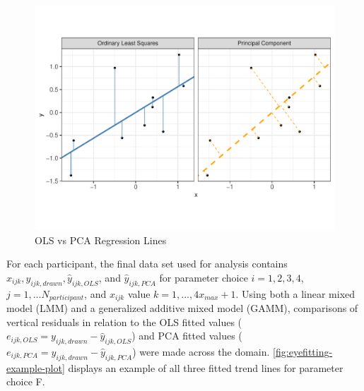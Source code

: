 \documentclass[print]{nuthesis}
\begin{document}
\begin{figure}
\includegraphics[width=1\linewidth]{thesis_files/figure-latex/ols-vs-pca-example-1} \caption{OLS vs PCA Regression Lines}\label{fig:ols-vs-pca-example}
\end{figure}

For each participant, the final data set used for analysis contains \(x_{ijk}, y_{ijk,drawn}, \hat y_{ijk,OLS}\), and \(\hat y_{ijk,PCA}\) for parameter choice \(i = 1,2,3,4\), \(j = 1,...N_{participant}\), and \(x_{ijk}\) value \(k = 1, ...,4 x_{max} + 1\).
Using both a linear mixed model (LMM) and a generalized additive mixed model (GAMM), comparisons of vertical residuals in relation to the OLS fitted values (\(e_{ijk,OLS} = y_{ijk,drawn} - \hat y_{ijk,OLS}\)) and PCA fitted values (\(e_{ijk,PCA} = y_{ijk,drawn} - \hat y_{ijk,PCA}\)) were made across the domain.
\cref{fig:eyefitting-example-plot} displays an example of all three fitted trend lines for parameter choice F.
\end{document}
